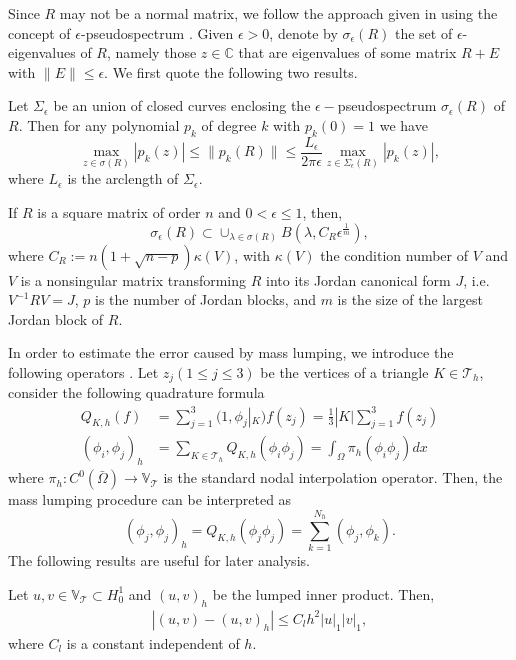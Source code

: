 \documentclass[smallcondensed]{svjour3}
\numberwithin{equation}{section} \numberwithin{table}{section}
\numberwithin{figure}{section}
\numberwithin{algorithm}{section}
\begin{document}
Since $R$ may not be a normal matrix, we follow the approach given in \cite{bansch2011preconditioning} using the concept of $\epsilon$-pseudospectrum \cite{trefethen2005spectra}. Given $\epsilon>0$, denote by $\sigma_{\epsilon}(R)$ the set of $\epsilon$-eigenvalues of $R$, namely those $z\in\mathbb{C}$ that are eigenvalues of some matrix $R+E$ with $\|E\|\leq\epsilon$. 
We first quote the following two results.

\begin{lemma}{\label{max-poly}} Let $\Sigma_\epsilon$ be an union of closed curves enclosing the $\epsilon-$pseudospectrum $\sigma_{\epsilon}(R)$ of $R$. Then for any polynomial $p_k$ of degree $k$ with $p_k(0)=1$ we have
\begin{equation}\label{max-poly-f}
\max_{z\in\sigma(R)}|p_k(z)|\leq\|p_k(R)\|\leq\frac{L_{\epsilon}}{2\pi\epsilon}\max_{z\in\Sigma_{\epsilon}(R)}|p_k(z)|,
\end{equation}
where $L_{\epsilon}$ is the arclength of $\Sigma_{\epsilon}$.
\end{lemma}

\begin{lemma} \label{p-bound}If $R$ is a square matrix of order $n$ and $0<\epsilon\leq 1$, then, 
$$
\sigma_{\epsilon}(R)\subset\cup_{\lambda\in\sigma(R)}B(\lambda, C_R\epsilon^{\frac{1}{m}}),
$$
where $C_R:=n(1+\sqrt{n-p})\kappa(V)$, with $\kappa(V)$ the condition number of $V$ and $V$ is a nonsingular matrix transforming $R$ into its Jordan canonical form $J$, i.e. $V^{-1}RV=J$, $p$ is the number of Jordan blocks, and $m$ is the size of the largest Jordan block of $R$.
\end{lemma}

In order to estimate the error caused by mass lumping, we introduce the following operators \cite{chenthomee1985lumped}. Let $z_j (1\leq j\leq 3)$ be the vertices of a triangle $K \in\mathcal{T}_h$, consider the following quadrature formula
\begin{align*}
Q_{K,h}(f) &=\sum_{j=1}^3(1,\phi_j|_{K})f(z_j)= \frac{1}{3}|K|\sum_{j=1}^3f(z_j) \\
(\phi_i,\phi_j)_h &= \sum_{K\in\mathcal{T}_h}Q_{K,h}(\phi_i\phi_j)=\int_{\Omega}\pi_h(\phi_i\phi_j)dx
\end{align*}
where $\pi_h: C^0(\bar{\Omega})\rightarrow \mathbb{V}_{\mathcal{T}}$ is the standard nodal interpolation operator. Then, the mass lumping procedure can be interpreted as
$$
(\phi_j,\phi_j)_h = Q_{K,h}(\phi_j\phi_j) = \sum_{k=1}^{N_h}(\phi_j,\phi_k).
$$
The following results are useful for later analysis.
\begin{lemma} \label{lumpmass-mass-error}
Let $u,v\in \mathbb{V}_{\mathcal{T}}\subset H_0^1$ and 
$
(u,v)_h
$
be the lumped inner product. Then, 
\begin{align}
|(u,v)-(u,v)_h|\leq C_l h^2|u|_1|v|_1,
\label{property3-M}
\end{align}
where $C_l$ is a constant independent of $h$.
\end{lemma}
\end{document}
